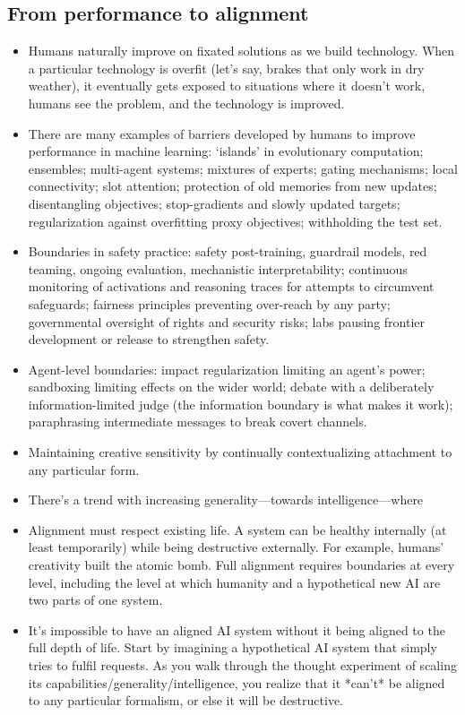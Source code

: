 \documentclass[11pt]{article}
\begin{document}
\subsection*{From performance to alignment}

\begin{itemize}
  \item Humans naturally improve on fixated solutions as we build technology. When a particular technology is overfit (let's say, brakes that only work in dry weather), it eventually gets exposed to situations where it doesn't work, humans see the problem, and the technology is improved.
  \item There are many examples of barriers developed by humans to improve performance in machine learning: `islands' in evolutionary computation; ensembles; multi-agent systems; mixtures of experts; gating mechanisms; local connectivity; slot attention; protection of old memories from new updates; disentangling objectives; stop-gradients and slowly updated targets; regularization against overfitting proxy objectives; withholding the test set.
  \item Boundaries in safety practice: safety post-training, guardrail models, red teaming, ongoing evaluation, mechanistic interpretability; continuous monitoring of activations and reasoning traces for attempts to circumvent safeguards; fairness principles preventing over-reach by any party; governmental oversight of rights and security risks; labs pausing frontier development or release to strengthen safety.
  \item Agent-level boundaries: impact regularization limiting an agent's power; sandboxing limiting effects on the wider world; debate with a deliberately information-limited judge (the information boundary is what makes it work); paraphrasing intermediate messages to break covert channels.
  \item Maintaining creative sensitivity by continually contextualizing attachment to any particular form.
  \item There's a trend with increasing generality---towards intelligence---where 
  \item Alignment must respect existing life. A system can be healthy internally (at least temporarily) while being destructive externally. For example, humans' creativity built the atomic bomb. Full alignment requires boundaries at every level, including the level at which humanity and a hypothetical new AI are two parts of one system. 
  \item It's impossible to have an aligned AI system without it being aligned to the full depth of life. Start by imagining a hypothetical AI system that simply tries to fulfil requests. As you walk through the thought experiment of scaling its capabilities/generality/intelligence, you realize that it *can't* be aligned to any particular formalism, or else it will be destructive. 

\end{itemize}
\end{document}
